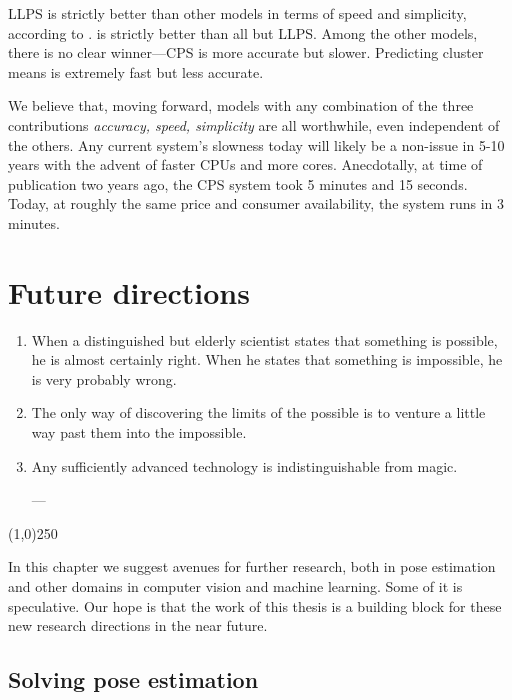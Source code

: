 LLPS is strictly better than other models in terms of speed and simplicity, 
according to . \citet{deva2011} is strictly better than all 
but LLPS.  Among the other models, there is no clear winner---CPS is more 
accurate but slower.  Predicting cluster means is extremely fast but less 
accurate.

We believe that, moving forward, models with any combination of the three 
contributions {\em accuracy, speed, simplicity} are all worthwhile, even 
independent of the others. Any current system's slowness today will likely be a 
non-issue in 5-10 years with the advent of faster CPUs and more cores.  
Anecdotally, at time of publication two years ago, the CPS system took 5 
minutes and 15 seconds.  Today, at roughly the same price and consumer 
availability, the system runs in 3 minutes.


\chapter{Future directions}
{\small
{\em \begin{enumerate}
  \setlength{\itemsep}{1pt}
  \setlength{\parskip}{0pt}
  \setlength{\parsep}{0pt}
\item When a distinguished but elderly scientist states that something is 
possible, he is almost certainly right. When he states that something is 
impossible, he is very probably wrong.
\item The only way of discovering the limits of the possible is to venture a 
little way past them into the impossible.
\item Any sufficiently advanced technology is indistinguishable from magic.
  \setlength{\itemsep}{16pt}
\item[---] 
\end{enumerate}
}
}
\line(1,0){250}
\vspace{0.5in}

In this chapter we suggest avenues for further research, both in pose 
estimation and other domains in computer vision and machine learning.  Some of 
it is speculative.  Our hope is that the work of this thesis is a building 
block for these new research directions in the near future. 


\section{Solving pose estimation}

